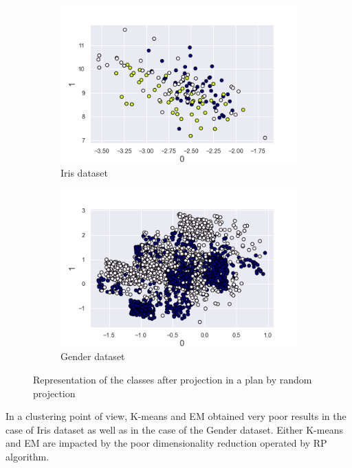 \documentclass[twocolumn, 10pt]{article}
\begin{document}
			\begin{figure}[h]
				\centering
				\begin{subfigure}[t]{0.49\columnwidth}
					\centering
					\includegraphics[width=\linewidth]{../graphics/rnd_iris_0_1_label.png}
					\caption{Iris dataset}
					\label{fig:rnd_iris}
				\end{subfigure}
				\begin{subfigure}[t]{0.49\columnwidth}
					\centering
					\includegraphics[width=\linewidth]{../graphics/rnd_g_0_1_label.png}
					\caption{Gender dataset}
					\label{fig:rnd_g}
				\end{subfigure}
				\caption{Representation of the classes after projection in a plan by random projection}
				\label{fig:rnd}
			\end{figure}

			In a clustering point of view, K-means and EM obtained very poor results in the case of Iris dataset as well as in the case of the Gender dataset. Either K-means and EM are impacted by the poor dimensionality reduction operated by RP algorithm.
\end{document}
